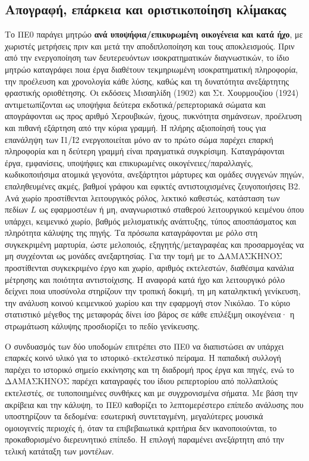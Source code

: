 \documentclass[11pt,a4paper]{article}
\begin{document}
\subsection{Απογραφή, επάρκεια και οριστικοποίηση κλίμακας}\label{app:corpora-gate}

Το ΠΕ0 παράγει μητρώο \textbf{ανά υποψήφια/επικυρωμένη οικογένεια και κατά ήχο}, με χωριστές μετρήσεις πριν και μετά την αποδιπλοποίηση και τους αποκλεισμούς. Πριν από την ενεργοποίηση των δευτερευόντων ισοκρατηματικών διαγνωστικών, το ίδιο μητρώο καταγράφει ποια έργα διαθέτουν τεκμηριωμένη ισοκρατηματική πληροφορία, την προέλευση και χρονολογία κάθε λύσης, καθώς και τη δυνατότητα ανεξάρτητης φραστικής οριοθέτησης. Οι εκδόσεις Μισαηλίδη (1902) και Στ. Χουρμουζίου (1924) αντιμετωπίζονται ως υποψήφια δεύτερα εκδοτικά/ρεπερτοριακά σώματα και απογράφονται ως προς αριθμό Χερουβικών, ήχους, πυκνότητα σημάνσεων, προέλευση και πιθανή εξάρτηση από την κύρια γραμμή. Η πλήρης αξιοποίησή τους για επανάληψη των I1/I2 ενεργοποιείται μόνο αν το πρώτο σώμα παρέχει επαρκή πληροφορία και η δεύτερη γραμμή είναι πραγματικά συγκρίσιμη. Καταγράφονται έργα, εμφανίσεις, υποψήφιες και επικυρωμένες οικογένειες/παραλλαγές, κωδικοποιήσιμα ατομικά γεγονότα, ανεξάρτητοι μάρτυρες και ομάδες συγγενών πηγών, επαληθευμένες ακμές, βαθμοί γράφου και εφικτές αντιστοιχισμένες ζευγοποιήσεις B2. Ανά χωρίο προστίθενται λειτουργικός ρόλος, λεκτικό καθεστώς, κατάσταση των πεδίων $L$ ως εφαρμοστέων ή μη, αναγνωριστικό σταθερού λειτουργικού κειμένου όπου υπάρχει, κειμενικό χωρίο, βαθμός μελισματικής ανάπτυξης, τύπος αποσπάσματος και πληρότητα κάλυψης της πηγής. Τα πρόσωπα καταγράφονται με ρόλο στη συγκεκριμένη μαρτυρία, ώστε μελοποιός, εξηγητής/μεταγραφέας και προσαρμογέας να μη συγχέονται ως μονάδες ανεξαρτησίας. Για την τομή με το ΔΑΜΑΣΚΗΝΟΣ προστίθενται συγκεκριμένο έργο και χωρίο, αριθμός εκτελεστών, διαθέσιμα κανάλια μέτρησης και ποιότητα αντιστοίχισης. Η αναφορά κατά ήχο και λειτουργικό ρόλο δείχνει ποια υποσύνολα στηρίζουν την τροπική δοκιμή, τη μη καταληκτική γενίκευση, την ανάλυση κοινού κειμενικού χωρίου και την εφαρμογή στον Νικόλαο. Το κύριο στατιστικό μέγεθος της μεταφοράς δίνει ίσο βάρος σε κάθε επιλέξιμη οικογένεια· η στρωμάτωση κάλυψης προσδιορίζει το πεδίο γενίκευσης.

Ο συνδυασμός των δύο υποδομών επιτρέπει στο ΠΕ0 να διαπιστώσει αν υπάρχει επαρκές κοινό υλικό για το ιστορικό--εκτελεστικό πείραμα. Η παπαδική συλλογή παρέχει το ιστορικό σημείο εκκίνησης και τη διαδρομή προς έργα και πηγές, ενώ το ΔΑΜΑΣΚΗΝΟΣ παρέχει καταγραφές του ίδιου ρεπερτορίου από πολλαπλούς εκτελεστές, σε τυποποιημένες συνθήκες και με συγχρονισμένα σήματα. Με βάση την ακρίβεια και την κάλυψη, το ΠΕ0 καθορίζει το λεπτομερέστερο επίπεδο ανάλυσης που υποστηρίζουν τα δεδομένα: εσωτερική συντεταγμένη, μεγαλύτερες μουσικά ομοιογενείς περιοχές ή, όταν τα επιβεβαιωτικά κριτήρια δεν ικανοποιούνται, το προκαθορισμένο διερευνητικό επίπεδο. Η επιλογή παραμένει ανεξάρτητη από την τελική κατάταξη των μοντέλων.
\end{document}
